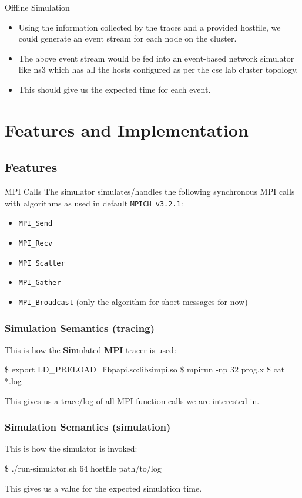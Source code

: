 \documentclass[pdf]{beamer}
\begin{document}
\begin{frame}{Offline Simulation}
  \begin{itemize}
    \item<1-> Using the information collected by the traces and a provided
      hostfile, we could generate an event stream for each node on the cluster.
    \item<2-> The above event stream would be fed into an event-based network
      simulator like ns3 which has all the hosts configured as per the cse lab
      cluster topology.
    \item<3-> This should give us the expected time for each event.
  \end{itemize}
\end{frame}
\section{Features and Implementation}
\subsection{Features}
\begin{frame}{MPI Calls}
  The simulator simulates/handles the following synchronous MPI calls with
  algorithms as used in default \texttt{MPICH v3.2.1}:
  \begin{itemize}
    \item \texttt{MPI\_Send}
    \item \texttt{MPI\_Recv}
    \item \texttt{MPI\_Scatter}
    \item \texttt{MPI\_Gather}
    \item \texttt{MPI\_Broadcast} (only the algorithm for short messages for
      now)
  \end{itemize}
\end{frame}
\begin{frame}[fragile]
  \frametitle{Simulation Semantics (tracing)}
  This is how the \textbf{Sim}ulated \textbf{MPI} tracer is used:
  \begin{semiverbatim}
    \$ export LD\_PRELOAD=libpapi.so:libsimpi.so
    \$ mpirun -np 32 prog.x
    \$ cat *.log
  \end{semiverbatim}
  This gives us a trace/log of all MPI function calls we are interested in.
\end{frame}
\begin{frame}[fragile]
  \frametitle{Simulation Semantics (simulation)}
  This is how the simulator is invoked:
  \begin{semiverbatim}
    \$ ./run-simulator.sh 64 hostfile path/to/log
  \end{semiverbatim}
  This gives us a value for the expected simulation time.
\end{frame}
\end{document}
